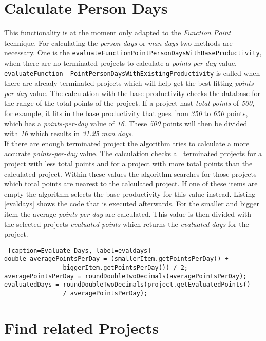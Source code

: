 \section{Calculate Person Days}

This functionality is at the moment only adapted to the \textit{Function Point} technique. For calculating the \textit{person days} or \textit{man days} two methods are necessary. One is the \texttt{evaluateFunctionPointPersonDaysWithBaseProductivity}, when there are no terminated projects to calculate a \textit{points-per-day} value. \texttt{evaluateFunction- PointPersonDaysWithExistingProductivity} is called when there are already terminated projects which will help get the best fitting \textit{points-per-day} value. The calculation with the base productivity checks the database for the range of the total points of the project. If a project hast \textit{total points} of \textit{500}, for example, it fits in the base productivity that goes from \textit{350} to \textit{650} points, which has a \textit{points-per-day} value of \textit{16}. These \textit{500} points will then be divided with \textit{16} which results in \textit{31.25} \textit{man days}.\\
If there are enough terminated project the algorithm tries to calculate a more accurate \textit{points-per-day} value. The calculation checks all terminated projects for a project with less total points and for a project with more total points than the calculated project. Within these values the algorithm searches for those projects which total points are nearest to the calculated project. If one of these items are empty the algorithm selects the base productivity for this value instead. Listing \ref{evaldays} shows the code that is executed afterwards. For the smaller and bigger item the average \textit{points-per-day} are calculated. This value is then divided with the selected projects \textit{evaluated points} which returns the \textit{evaluated days} for the project.
\begin{lstlisting} [caption=Evaluate Days, label=evaldays] 
double averagePointsPerDay = (smallerItem.getPointsPerDay() + 
				biggerItem.getPointsPerDay()) / 2;
averagePointsPerDay = roundDoubleTwoDecimals(averagePointsPerDay);
evaluatedDays = roundDoubleTwoDecimals(project.getEvaluatedPoints() 
				/ averagePointsPerDay);
\end{lstlisting}
\section{Find related Projects}

